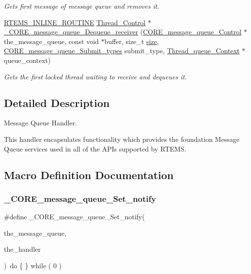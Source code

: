 \begin{DoxyCompactItemize}
\begin{DoxyCompactList}\small\item\em Gets first message of message queue and removes it. \end{DoxyCompactList}\item 
\mbox{\hyperlink{group__RTEMSScoreBaseDefs_gac216239df231d5dbd15e3520b0b9313f}{R\+T\+E\+M\+S\+\_\+\+I\+N\+L\+I\+N\+E\+\_\+\+R\+O\+U\+T\+I\+NE}} \mbox{\hyperlink{struct__Thread__Control}{Thread\+\_\+\+Control}} $\ast$ \mbox{\hyperlink{group__RTEMSScoreMessageQueue_ga64d8088809673c8f4492ac5f46987537}{\+\_\+\+C\+O\+R\+E\+\_\+message\+\_\+queue\+\_\+\+Dequeue\+\_\+receiver}} (\mbox{\hyperlink{structCORE__message__queue__Control}{C\+O\+R\+E\+\_\+message\+\_\+queue\+\_\+\+Control}} $\ast$the\+\_\+message\+\_\+queue, const void $\ast$buffer, size\+\_\+t \mbox{\hyperlink{sun4u_2tte_8h_a245260f6f74972558f61b85227df5aae}{size}}, \mbox{\hyperlink{group__RTEMSScoreMessageQueue_ga0859edb437502e53fd2c7a73bce6b33c}{C\+O\+R\+E\+\_\+message\+\_\+queue\+\_\+\+Submit\+\_\+types}} submit\+\_\+type, \mbox{\hyperlink{structThread__queue__Context}{Thread\+\_\+queue\+\_\+\+Context}} $\ast$queue\+\_\+context)
\begin{DoxyCompactList}\small\item\em Gets the first locked thread waiting to receive and dequeues it. \end{DoxyCompactList}\end{DoxyCompactItemize}


\subsection{Detailed Description}
Message Queue Handler. 

This handler encapsulates functionality which provides the foundation Message Queue services used in all of the A\+P\+Is supported by R\+T\+E\+MS. 

\subsection{Macro Definition Documentation}
\mbox{\label{group__RTEMSScoreMessageQueue_ga9ff0250bdbba22ed859cd8a1a5352c2e}} 
\subsubsection{\texorpdfstring{\_CORE\_message\_queue\_Set\_notify}{\_CORE\_message\_queue\_Set\_notify}}
{\footnotesize\ttfamily \#define \+\_\+\+C\+O\+R\+E\+\_\+message\+\_\+queue\+\_\+\+Set\+\_\+notify(\begin{DoxyParamCaption}\item[{}]{the\+\_\+message\+\_\+queue,  }\item[{}]{the\+\_\+handler }\end{DoxyParamCaption})~do \{ \} while ( 0 )}



